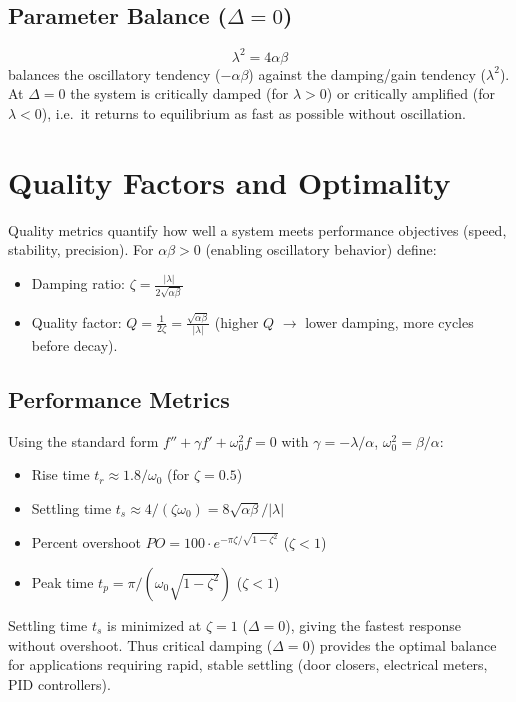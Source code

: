 \documentclass[11pt]{article}
\begin{document}
\subsection{Parameter Balance ($\Delta=0$)}
\[
\lambda^2 = 4\alpha\beta
\]
balances the oscillatory tendency ($-\alpha\beta$) against the damping/gain tendency ($\lambda^2$). At $\Delta=0$ the system is critically damped (for $\lambda>0$) or critically amplified (for $\lambda<0$), i.e.\ it returns to equilibrium as fast as possible without oscillation.

\section{Quality Factors and Optimality}
Quality metrics quantify how well a system meets performance objectives (speed, stability, precision). For $\alpha\beta>0$ (enabling oscillatory behavior) define:
\begin{itemize}
\item Damping ratio: $\displaystyle\zeta = \frac{|\lambda|}{2\sqrt{\alpha\beta}}$
\item Quality factor: $\displaystyle Q = \frac{1}{2\zeta} = \frac{\sqrt{\alpha\beta}}{|\lambda|}$ (higher $Q$ $\rightarrow$ lower damping, more cycles before decay).
\end{itemize}

\subsection{Performance Metrics}
Using the standard form $f'' + \gamma f' + \omega_0^2 f = 0$ with $\gamma = -\lambda/\alpha$, $\omega_0^2 = \beta/\alpha$:
\begin{itemize}
\item Rise time $t_r \approx 1.8/\omega_0$ (for $\zeta=0.5$)
\item Settling time $t_s \approx 4/(\zeta \omega_0) = 8\sqrt{\alpha\beta}/|\lambda|$
\item Percent overshoot $PO = 100 \cdot e^{-\pi\zeta/\sqrt{1-\zeta^2}}$ ($\zeta<1$)
\item Peak time $t_p = \pi/(\omega_0\sqrt{1-\zeta^2})$ ($\zeta<1$)
\end{itemize}
Settling time $t_s$ is minimized at $\zeta=1$ ($\Delta=0$), giving the fastest response without overshoot. Thus critical damping ($\Delta=0$) provides the optimal balance for applications requiring rapid, stable settling (door closers, electrical meters, PID controllers).
\end{document}
